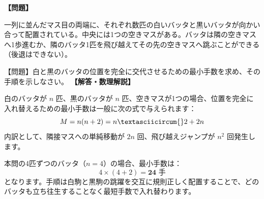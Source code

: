 \documentclass[10pt,a4paper,oneside,openany]{ltjsbook}
\begin{document}
\begin{tcolorbox}[colback=softblue,colframe=primaryblue,title=\textbf{第 215 問：バッタの跳躍パズル （原題: THE GRASSHOPPER PUZZLE.）},arc=2mm,boxrule=1pt,breakable]
\textbf{【問題】}\par\vspace{0.3em}
一列に並んだマス目の両端に、それぞれ数匹の白いバッタと黒いバッタが向かい合って配置されている。中央には1つの空きマスがある。バッタは隣の空きマスへ1歩進むか、隣のバッタ1匹を飛び越えてその先の空きマスへ跳ぶことができる（後退はできない）。

【問題】白と黒のバッタの位置を完全に交代させるための最小手数を求め、その手順を示しなさい。
\tcblower
\textbf{【解答・数理解説】}\par\vspace{0.3em}
白のバッタが $n$ 匹、黒のバッタが $n$ 匹、空きマスが1つの場合、位置を完全に入れ替えるための最小手数は一般に次の式で与えられます：
\[ M = n(n + 2) = n\textasciicircum{}2 + 2n \]
内訳として、隣接マスへの単純移動が $2n$ 回、飛び越えジャンプが $n^2$ 回発生します。

本問の4匹ずつのバッタ（$n=4$）の場合、最小手数は：
\[ 4 \times (4 + 2) = \mathbf{24 \text{ 手}} \]
となります。手順は白駒と黒駒の跳躍を交互に規則正しく配置することで、どのバッタも立ち往生することなく最短手数で入れ替わります。
\end{tcolorbox}
\end{document}
